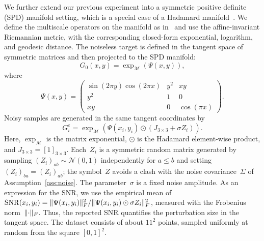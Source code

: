 \documentclass[12pt]{article}
\DeclarePairedDelimiter{\norm}{\lVert}{\rVert}
\newcommand{\M}{\mathcal{M}}
\begin{document}
We further extend our previous experiment into a symmetric positive definite (SPD) manifold setting, which is a special case of a Hadamard manifold~\cite{bhatia2009positive}. We define the multiscale operators on the manifold as in~\cite {sharon2022multiscale} and use the affine-invariant Riemannian metric, with the corresponding closed-form exponential, logarithm, and geodesic distance. The noiseless target is defined in the tangent space of symmetric matrices and then projected to the SPD manifold:
\begin{equation}\label{eq:spd-target}
    G_0(x,y) = \exp_\M\left(\Psi(x,y)\right),
\end{equation}
where
\begin{equation*}
    \Psi(x,y)= \begin{pmatrix}
    \sin(2\pi y)\cos(2\pi x) & y^2 & xy\\
    y^2 &  1 & 0 \\ xy & 0 & \cos(\pi x)
    \end{pmatrix}.
\end{equation*}
Noisy samples are generated in the same tangent coordinates by
\[
    G_i^\varepsilon
    =
    \exp_\M\left(\Psi(x_i,y_i)\odot (J_{3\times3}+\sigma Z_i)\right).
\]
Here, $\exp_\M$ is the matrix exponential, $\odot$ is the Hadamard element-wise product, and $J_{3\times3}=[1]_{3\times3}$. Each~$Z_i$ is a symmetric random matrix generated by sampling $(Z_i)_{ab}\sim\mathcal N(0,1)$ independently for $a\leq b$ and setting $(Z_i)_{ba}=(Z_i)_{ab}$; the symbol~$Z$ avoids a clash with the noise covariance~$\Sigma$ of Assumption~\ref{ass:noise}. The parameter~$\sigma$ is a fixed noise amplitude. As an expression for the SNR, we use the empirical mean of~$\operatorname{SNR}(x_i,y_i)={\norm{\Psi(x_i,y_i)}_F^2}/{\norm{\Psi(x_i,y_i)\odot \sigma Z_i}_F^2}$, measured with the Frobenius norm~$\norm{\cdot}_F$. Thus, the reported SNR quantifies the perturbation size in the tangent space. The dataset consists of about $11^2$ points, sampled uniformly at random from the square $[0,1]^2$.
\end{document}
